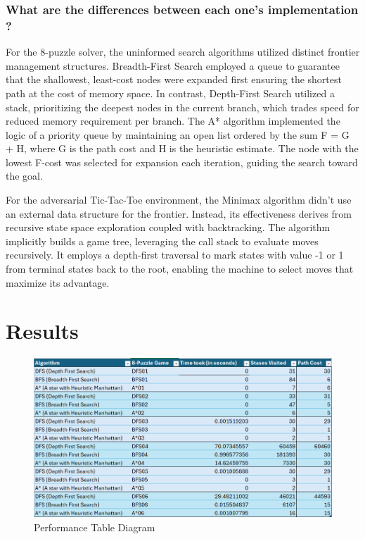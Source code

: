 \documentclass[journal]{./IEEE/IEEEtran}
\begin{document}
\subsubsection{What are the differences between each one’s implementation ?}
For the 8-puzzle solver, the uninformed search algorithms utilized distinct frontier management structures. Breadth-First Search employed a queue to guarantee that the shallowest, least-cost nodes were expanded first ensuring the shortest path at the cost of memory space. In contrast, Depth-First Search utilized a stack, prioritizing the deepest nodes in the current branch, which trades speed for reduced memory requirement per branch. The A* algorithm implemented the logic of a priority queue by maintaining an open list ordered by the sum F = G + H, where G is the path cost and H is the heuristic estimate. The node with the lowest F-cost was selected for expansion each iteration, guiding the search toward the goal.

For the adversarial Tic-Tac-Toe environment, the Minimax algorithm didn't use an external data structure for the frontier. Instead, its effectiveness derives from recursive state space exploration coupled with backtracking. The algorithm implicitly builds a game tree, leveraging the call stack to evaluate moves recursively. It employs a depth-first traversal to mark states with value -1 or 1 from terminal states back to the root, enabling the machine to select moves that maximize its advantage.
\section{Results}
\begin{figure}[H]
    \centering
    \includegraphics[width=1\linewidth]{pictures-Clarence/performance table.png}
    \caption{Performance Table Diagram}
    \label{fig:performance_table}
\end{figure}
\end{document}
